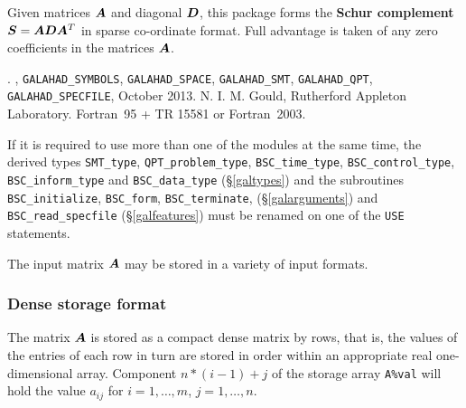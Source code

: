 \documentclass{galahad}
\newcommand{\packagename}{BSC}
\newcommand{\fullpackagename}{\libraryname\_\packagename}
\begin{document}
\galheader


\galsummary
Given matrices ${\bm{A}}$ and diagonal ${\bm{D}}$, this package forms the 
{\bf Schur complement} ${\bm{S}} = {\bm{A}} {\bm{D}} {\bm{A}}^T$ in sparse co-ordinate format.
Full advantage is taken of any zero coefficients in the matrices ${\bm{A}}$.


\galattributes
\galversions{\tt  \fullpackagename\_single, \fullpackagename\_double}.
,
{\tt GALAHAD\_\-SY\-M\-BOLS}, 
{\tt GALAHAD\-\_SPACE}, 
{\tt GALAHAD\_SMT},
{\tt GALAHAD\_QPT},
{\tt GALAHAD\_SPECFILE},
\galdate October 2013.
\galorigin N. I. M. Gould,
Rutherford Appleton Laboratory.
\gallanguage Fortran~95 + TR 15581 or Fortran~2003. 


\galhowto




\noindent
If it is required to use more than one of the modules at the same time, 
the derived types
{\tt SMT\_type}, 
{\tt QPT\_problem\_type}, 
{\tt \packagename\_time\_type}, 
{\tt \packagename\_control\_type}, 
{\tt \packagename\_inform\_type} 
and
{\tt \packagename\_data\_type}
(\S\ref{galtypes})
and the subroutines
{\tt \packagename\_initialize}, 
{\tt \packagename\_\-form},
{\tt \packagename\_terminate},
(\S\ref{galarguments})
and 
{\tt \packagename\_read\_specfile}
(\S\ref{galfeatures})
must be renamed on one of the {\tt USE} statements.


\galmatrix
The input matrix ${\bm{A}}$ may be stored in a variety of input formats.

\subsubsection{Dense storage format}\label{dense}
The matrix ${\bm{A}}$ is stored as a compact 
dense matrix by rows, that is, the values of the entries of each row in turn are
stored in order within an appropriate real one-dimensional array.
Component $n \ast (i-1) + j$ of the storage array {\tt A\%val} will hold the 
value $a_{ij}$ for $i = 1, \ldots , m$, $j = 1, \ldots , n$.
\end{document}
